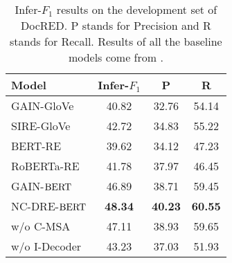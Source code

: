 \documentclass[sigconf,natbib=true]{acmart}
\begin{document}
\begin{table}[]
\centering
\begin{tabular}{p{3.5cm}ccc} 
\toprule
Model                       & Infer-$F_1$      & P         &R         \\ [2pt] \toprule
GAIN-GloVe             &40.82          & 32.76     &54.14           \\
SIRE-GloVe             & 42.72         & 34.83     &55.22        \\ \toprule
BERT-RE             & 39.62         & 34.12     &47.23        \\
RoBERTa-RE              & 41.78         & 37.97     &46.45        \\
GAIN-$\rm BERT$            & 46.89         & 38.71     &59.45           \\[2pt] \toprule
NC-DRE-$\rm BERT$        &  \textbf{48.34}           &  \textbf{40.23}     & \textbf{60.55}  \\
w/o C-MSA          &47.11     &38.93    &59.65  \\
w/o I-Decoder          &43.23     &37.03    &51.93   \\
\bottomrule
\end{tabular}
\caption{Infer-$F_1$ results on the development set of DocRED. P stands for Precision and R stands for Recall.
Results of all the baseline models come from \cite{c:118,c:121}.
}
\label{tab5}
\end{table}
\end{document}
